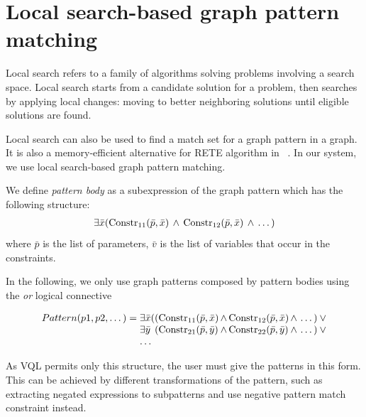 \section{Local search-based graph pattern matching}

Local search refers to a family of algorithms solving problems involving a search space. 
Local search starts from a candidate solution for a problem, then searches by applying local changes: moving to better neighboring solutions until eligible solutions are found.

Local search can also be used to find a match set for a graph pattern in a graph.
It is also a memory-efficient alternative for RETE algorithm in \viatra{}~\cite{bur-marton-msc}.
In our system, we use local search-based graph pattern matching. 

We define \emph{pattern body} as a subexpression of the graph pattern which has the following structure:
\begin{equation*}
\begin{array}{@{}c@{}}
\exists{\bar{x}} 
(\text{Constr}_{11}(\bar{p},\bar{x} ) \, \wedge \, 
 \text{Constr}_{12}(\bar{p},\bar{x} ) \, \wedge \, \dots{})
\end{array}
\end{equation*}
where $\bar{p}$ is the list of parameters, $\bar{v}$ is the list of variables that occur in the constraints.

In the following, we only use graph patterns composed by pattern bodies using the \emph{or} logical connective

\begin{equation*}
\begin{array}{@{}r@{}l@{}l@{}l@{}l@{}}
Pattern(p1, p2, \dots) = \;
& \exists{\bar{x}} ( & 
(\text{Constr}_{11}(\bar{p},\bar{x} ) & \, \wedge \, \text{Constr}_{12}(\bar{p},\bar{x} ) & \, \wedge \, \dots{}) \: \vee \\

& \exists{\bar{y}} & 
(\text{Constr}_{21}(\bar{p},\bar{y} ) & \, \wedge \, \text{Constr}_{22}(\bar{p},\bar{y} ) & \, \wedge \, \dots{}) \: \vee \\
& \dots{}
\end{array}
\end{equation*}

As VQL permits only this structure, the user must give the patterns in this form. This can be achieved by different transformations of the pattern, such as extracting negated expressions to subpatterns  and use negative pattern match constraint instead.

